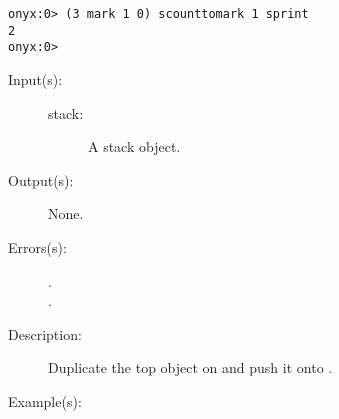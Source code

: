 \begin{description}
\begin{description}
\begin{verbatim}
onyx:0> (3 mark 1 0) scounttomark 1 sprint
2
onyx:0>
		\end{verbatim}
	\end{description}
\label{systemdict:sdup}
\item[{\onyxop{stack}{sdup}{--}}: ]
	\begin{description}\item[]
	\item[Input(s): ]
		\begin{description}\item[]
		\item[stack: ]
			A stack object.
		\end{description}
	\item[Output(s): ] None.
	\item[Errors(s): ]
		\begin{description}\item[]
		\item[.]
		\item[.]
		\end{description}
	\item[Description: ]
		Duplicate the top object on  and push it onto
		.
	\item[Example(s): ]\begin{verbatim}


\end{verbatim}
\end{description}
\end{description}
